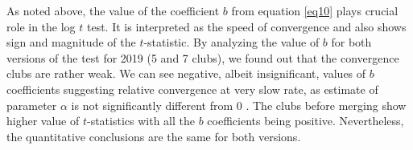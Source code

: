 \documentclass[11pt]{article}
\begin{document}
\begin{table}[!htbp] \centering 
 \caption{Convergence club classification after merging} 
  \label{Table_clubs1} 
\end{table}

\begin{table}[!htbp] \centering 
 \caption{Convergence club classification after merging (2015)} 
  \label{Table_clubs1_2015} 
\end{table}


As noted above, the value of the coefficient $b$ from equation \ref{eq10} plays crucial role in the log $t$ test. It is interpreted as the speed of convergence and also shows sign and magnitude of the $t$-statistic. By analyzing the value of $b$ for both versions of the test for 2019 (5 and 7 clubs), we found out that the convergence clubs are rather weak. We can see negative, albeit insignificant, values of $b$ coefficients suggesting relative convergence at very slow rate, as estimate of parameter $\alpha$ is not significantly different from 0 \citep{phillips2007transition}. The clubs before merging show higher value of $t$-statistics with all the $b$ coefficients being positive. Nevertheless, the quantitative conclusions are the same for both versions.
\end{document}
